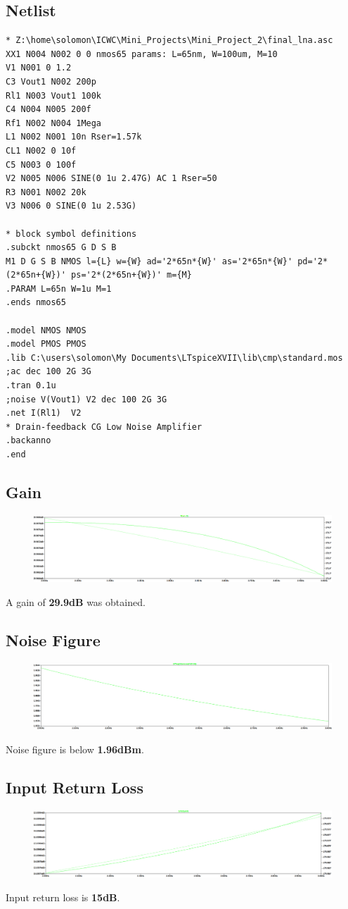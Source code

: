 \documentclass{article}
\begin{document}
\subsection*{Netlist}
\begin{lstlisting}
* Z:\home\solomon\ICWC\Mini_Projects\Mini_Project_2\final_lna.asc
XX1 N004 N002 0 0 nmos65 params: L=65nm, W=100um, M=10
V1 N001 0 1.2
C3 Vout1 N002 200p
Rl1 N003 Vout1 100k
C4 N004 N005 200f
Rf1 N002 N004 1Mega
L1 N002 N001 10n Rser=1.57k
CL1 N002 0 10f
C5 N003 0 100f
V2 N005 N006 SINE(0 1u 2.47G) AC 1 Rser=50
R3 N001 N002 20k
V3 N006 0 SINE(0 1u 2.53G)

* block symbol definitions
.subckt nmos65 G D S B
M1 D G S B NMOS l={L} w={W} ad='2*65n*{W}' as='2*65n*{W}' pd='2*(2*65n+{W})' ps='2*(2*65n+{W})' m={M}
.PARAM L=65n W=1u M=1
.ends nmos65

.model NMOS NMOS
.model PMOS PMOS
.lib C:\users\solomon\My Documents\LTspiceXVII\lib\cmp\standard.mos
;ac dec 100 2G 3G
.tran 0.1u
;noise V(Vout1) V2 dec 100 2G 3G
.net I(Rl1)  V2
* Drain-feedback CG Low Noise Amplifier
.backanno
.end
\end{lstlisting}
\subsection*{Gain}
\begin{figure}[H]
	\includegraphics[scale=0.27]{../figs/gain.png}
\end{figure}
A gain of \textbf{29.9dB} was obtained.
\subsection*{Noise Figure}
\begin{figure}[H]
	\includegraphics[scale=0.27]{../figs/nf.png}
\end{figure}
Noise figure is below \textbf{1.96dBm}.
\subsection*{Input Return Loss}
\begin{figure}[H]
	\includegraphics[scale=0.27]{../figs/Input_returnloss.png}
\end{figure}
Input return loss is \textbf{15dB}.
\end{document}
